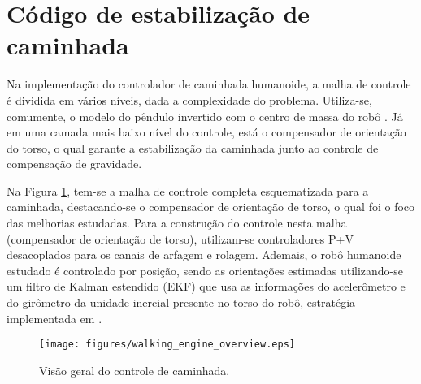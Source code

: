 
\section{Código de estabilização de caminhada}\label{sec:estab}

Na implementação do controlador de caminhada humanoide, a malha de controle é dividida em vários níveis, dada a complexidade do problema. Utiliza-se, comumente, o modelo do pêndulo invertido com o centro de massa do robô \cite{kajita2001}. Já em uma camada mais baixo nível do controle, está o compensador de orientação do torso, o qual garante a estabilização da caminhada junto ao controle de compensação de gravidade. 

Na Figura \ref{fig:visao_geral}, tem-se a malha de controle completa esquematizada para a caminhada, destacando-se o compensador de orientação de torso, o qual foi o foco das melhorias estudadas. Para a construção do controle nesta malha (compensador de orientação de torso), utilizam-se controladores P+V desacoplados para os canais de arfagem e rolagem. Ademais, o robô humanoide estudado é controlado por posição, sendo as orientações estimadas utilizando-se um filtro de Kalman estendido (EKF) que usa as informações do acelerômetro e do girômetro da unidade inercial presente no torso do robô, estratégia implementada em \cite{tesemarcos}.


\begin{figure}
\centering
\texttt{[image: figures/walking\_engine\_overview.eps]}
\caption{Visão geral do controle de caminhada.}
\label{fig:visao_geral}
\end{figure} 

